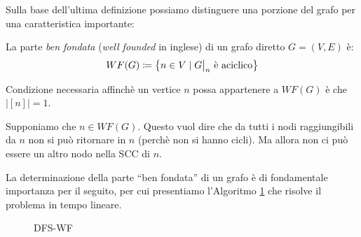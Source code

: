 Sulla base dell'ultima definizione possiamo distinguere una porzione del grafo per una caratteristica importante:
\begin{definition}
    La parte \emph{ben fondata} (\emph{well founded} in inglese) di un grafo diretto $G = (V,E)$ è:
    \begin{gather*}
        WF(G) \coloneqq \left\{n \in V \mid \restr{G}{n} \text{ è aciclico}\right\}
    \end{gather*}
\end{definition}
\begin{observation}
    Condizione necessaria affinchè un vertice $n$ possa appartenere a $WF(G)$ è che $|[n]| = 1$.
\end{observation}
\begin{proof2}
    Supponiamo che $n \in WF(G)$. Questo vuol dire che da tutti i nodi raggiungibili da $n$ non si può ritornare in $n$ (perchè non si hanno cicli). Ma allora non ci può essere un altro nodo nella SCC di $n$.
\end{proof2}
La determinazione della parte ``ben fondata'' di un grafo è di fondamentale importanza per il seguito, per cui presentiamo l'Algoritmo \ref{alg:dfs-wf} che risolve il problema in tempo lineare.
\begin{figure}
    \begin{algorithm}[H]
        \label{alg:dfs-wf}
        \caption{DFS-WF}
        \SetAlgoLined
    \end{algorithm}
\end{figure}

